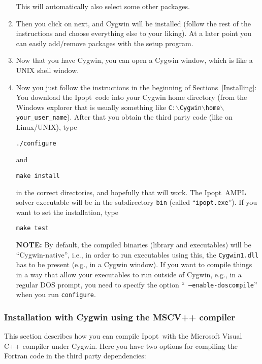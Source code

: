 \documentclass[10pt]{article}
\newcommand{\Ipopt}{{\sc Ipopt}}
\begin{document}
\begin{enumerate}
  This will automatically also select some other packages.
\item\label{it:cyg_done} Then you click on next, and Cygwin will be
  installed (follow the rest of the instructions and choose everything
  else to your liking).  At a later point you can easily add/remove
  packages with the setup program.

\item Now that you have Cygwin, you can open a Cygwin window, which is
  like a UNIX shell window.

\item\label{it:cyg_inst} Now you just follow the instructions in the
  beginning of Sections~\ref{Installing}: You download the \Ipopt\
  code into your Cygwin home directory (from the Windows explorer that
  is usually something like
  \texttt{C:$\backslash$Cygwin$\backslash$home$\backslash$your\_user\_name}).
  After that you obtain the third party code (like on Linux/UNIX),
  type

  \texttt{./configure}

  and

  \texttt{make install}

  in the correct directories, and hopefully that will work.  The
  \Ipopt\ AMPL solver executable will be in the subdirectory
  \texttt{bin} (called ``\texttt{ipopt.exe}'').  If you want to set
  the installation, type

  \texttt{make test}

  \textbf{NOTE:} By default, the compiled binaries (library and
  executables) will be ``Cygwin-native'', i.e., in order to run
  executables using this, the {\tt Cygwin1.dll} has to be present
  (e.g., in a Cygwin window).  If you want to compile things in a way
  that allow your executables to run outside of Cygwin, e.g., in a
  regular DOS prompt, you need to specify the option ``{\tt
    --enable-doscompile}'' when you run {\tt configure}.
\end{enumerate}

\subsubsection{Installation with Cygwin using the MSCV++ compiler}
\label{CygwinInstallNative}

This section describes how you can compile \Ipopt\ with the Microsoft
Visual C++ compiler under Cygwin.  Here you have two options for
compiling the Fortran code in the third party dependencies:
\end{document}
